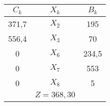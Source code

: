     \begin{tabular}{ccc}
    \hline
    \hline
    $C_k$   & $X_k$   & $B_k$ \bigstrut\\
    \hline
    371,7   & $X_2$   & 195 \bigstrut[t]\\
    556,4   & $X_3$   & 70 \\
    0       & $X_6$   & 234,5 \\
    0       & $X_7$   & 553 \\
    0       & $X_8$   & 5 \bigstrut[b]\\
    \hline
            & $Z=368,30$ &  \bigstrut\\
    \hline
    \hline
    \end{tabular}%
